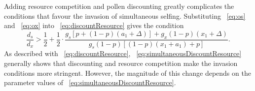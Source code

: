 \documentclass[letterpaper,titlepage]{scrartcl}
\begin{document}
Adding resource competition and pollen discounting greatly complicates
the conditions that favour the invasion of simultaneous
selfing. Substituting {\eref}~\eqref{eq:os} and {\eref}~\eqref{eq:ox} into
{\eref}~\eqref{eq:discountResource} gives the condition
\begin{equation}\label{eq:simultaneousDiscountResource}
  \frac{d_{s}}{d_{x}}>\frac{1}{2}+\frac{1}{2}\cdot\frac{g_{s}[p+(1-p)(a_{1}+\Delta)]+g_{x}(1-p)(x_{1}+\Delta)}{g_{s}(1-p)[(1-p)(x_{1}+a_{1})+p]}.
\end{equation}
As described with {\eref}~\eqref{eq:discountResource},
{\eref}~\eqref{eq:simultaneousDiscountResource} generally shows that
discounting and resource competition make the invasion conditions more
stringent. However, the magnitude of this change depends on the
parameter values of {\eref}~\eqref{eq:simultaneousDiscountResource}.


\end{document}
